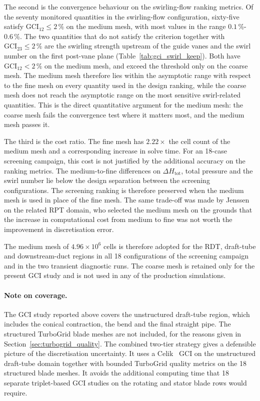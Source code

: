 The second is the convergence behaviour on the swirling-flow ranking metrics. Of the seventy monitored quantities in the swirling-flow configuration, sixty-five satisfy $\mathrm{GCI}_{12} \leq 2\,\%$ on the medium mesh, with most values in the range $0.1\,\%$-$0.6\,\%$. The two quantities that do not satisfy the criterion together with $\mathrm{GCI}_{23} \leq 2\,\%$ are the swirling strength upstream of the guide vanes and the swirl number on the first post-vane plane (Table~\ref{tab:gci_swirl_keep}). Both have $\mathrm{GCI}_{12} < 2\,\%$ on the medium mesh, and exceed the threshold only on the coarse mesh. The medium mesh therefore lies within the asymptotic range with respect to the fine mesh on every quantity used in the design ranking, while the coarse mesh does not reach the asymptotic range on the most sensitive swirl-related quantities. This is the direct quantitative argument for the medium mesh: the coarse mesh fails the convergence test where it matters most, and the medium mesh passes it.

The third is the cost ratio. The fine mesh has $2.22\times$ the cell count of the medium mesh and a corresponding increase in solve time. For an 18-case screening campaign, this cost is not justified by the additional accuracy on the ranking metrics. The medium-to-fine differences on $\Delta H_{\mathrm{tot}}$, total pressure and the swirl number lie below the design separation between the screening configurations. The screening ranking is therefore preserved when the medium mesh is used in place of the fine mesh. The same trade-off was made by Jenssen~\cite{Jenssen2020} on the related RPT domain, who selected the medium mesh on the grounds that the increase in computational cost from medium to fine was not worth the improvement in discretisation error.

The medium mesh of $4.96\times 10^6$ cells is therefore adopted for the RDT, draft-tube and downstream-duct regions in all 18 configurations of the screening campaign and in the two transient diagnostic runs. The coarse mesh is retained only for the present GCI study and is not used in any of the production simulations.

\paragraph{Note on coverage.}
The GCI study reported above covers the unstructured draft-tube region, which includes the conical contraction, the bend and the final straight pipe. The structured TurboGrid blade meshes are not included, for the reasons given in Section~\ref{sec:turbogrid_quality}. The combined two-tier strategy gives a defensible picture of the discretisation uncertainty. It uses a Celik~\cite{Celik2008} GCI on the unstructured draft-tube domain together with bounded TurboGrid quality metrics on the 18 structured blade meshes. It avoids the additional computing time that 18 separate triplet-based GCI studies on the rotating and stator blade rows would require.
 
